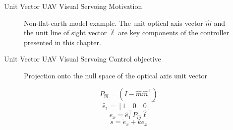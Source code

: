 \documentclass[9pt]{beamer}
\begin{document}
\begin{frame}{Unit Vector UAV Visual Servoing}
Motivation
\begin{figure}[htbp]
	\centering
	\caption{Non-flat-earth model example. The unit optical axis vector $\hat{m}$ and the unit line of sight vector $\hat{\ell}$ are key components of the controller presented in this chapter.}
	\label{nonflatearth}
\end{figure}
\end{frame}

\begin{frame}{Unit Vector UAV Visual Servoing}
Control objective
\begin{figure}[htbp]
	\centering
	\caption{Projection onto the null space of the optical axis unit vector}
	\label{projection}
\end{figure}
$$P_{\hat{m}}=(I-\hat{m}\hat{m}^\top)$$
$$\hat{e}_1=[1 \quad 0 \quad 0]^\top$$
$$e_x=\hat{e}_1^{\top}P_{\hat{m}}\hat{\ell}$$
$$s=\dot{e}_x+ke_x$$
\end{frame}
\end{document}
